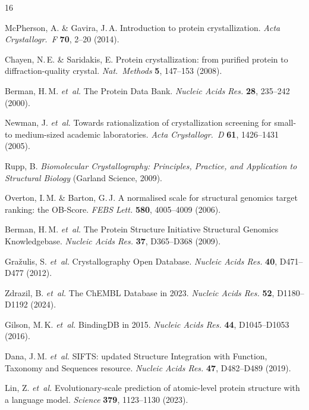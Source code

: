 \documentclass[11pt]{article}
\begin{document}
\clearpage
\begin{thebibliography}{16}

McPherson, A. \& Gavira, J.\,A.
Introduction to protein crystallization.
\textit{Acta Crystallogr.\ F} \textbf{70}, 2--20 (2014).

Chayen, N.\,E. \& Saridakis, E.
Protein crystallization: from purified protein to diffraction-quality crystal.
\textit{Nat.\ Methods} \textbf{5}, 147--153 (2008).

Berman, H.\,M. \textit{et~al.}
The Protein Data Bank.
\textit{Nucleic Acids Res.} \textbf{28}, 235--242 (2000).

Newman, J. \textit{et~al.}
Towards rationalization of crystallization screening for small- to medium-sized academic laboratories.
\textit{Acta Crystallogr.\ D} \textbf{61}, 1426--1431 (2005).

Rupp, B.
\textit{Biomolecular Crystallography: Principles, Practice, and Application to Structural Biology} (Garland Science, 2009).

Overton, I.\,M. \& Barton, G.\,J.
A normalised scale for structural genomics target ranking: the OB-Score.
\textit{FEBS Lett.} \textbf{580}, 4005--4009 (2006).

Berman, H.\,M. \textit{et~al.}
The Protein Structure Initiative Structural Genomics Knowledgebase.
\textit{Nucleic Acids Res.} \textbf{37}, D365--D368 (2009).

Gra\v{z}ulis, S. \textit{et~al.}
Crystallography Open Database.
\textit{Nucleic Acids Res.} \textbf{40}, D471--D477 (2012).

Zdrazil, B. \textit{et~al.}
The ChEMBL Database in 2023.
\textit{Nucleic Acids Res.} \textbf{52}, D1180--D1192 (2024).

Gilson, M.\,K. \textit{et~al.}
BindingDB in 2015.
\textit{Nucleic Acids Res.} \textbf{44}, D1045--D1053 (2016).

Dana, J.\,M. \textit{et~al.}
SIFTS: updated Structure Integration with Function, Taxonomy and Sequences resource.
\textit{Nucleic Acids Res.} \textbf{47}, D482--D489 (2019).

Lin, Z. \textit{et~al.}
Evolutionary-scale prediction of atomic-level protein structure with a language model.
\textit{Science} \textbf{379}, 1123--1130 (2023).


\end{thebibliography}
\end{document}
